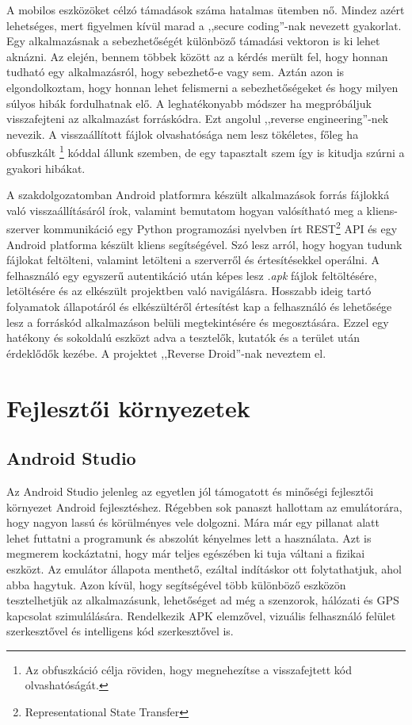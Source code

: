 \documentclass{thesis-ekf}
\theoremstyle{definition}
\theoremstyle{remark}
\begin{document}
A mobilos eszközöket célzó támadások száma hatalmas ütemben nő. Mindez azért lehetséges, mert figyelmen kívül marad a ,,secure coding''-nak nevezett gyakorlat.
Egy alkalmazásnak a sebezhetőségét különböző támadási vektoron is ki lehet aknázni.
Az elején, bennem többek között az a kérdés merült fel, hogy honnan tudható egy alkalmazásról, hogy sebezhető-e vagy sem.
Aztán azon is elgondolkoztam, hogy honnan lehet felismerni a sebezhetőségeket és hogy milyen súlyos hibák fordulhatnak elő.
A leghatékonyabb módszer ha megpróbáljuk visszafejteni az alkalmazást forráskódra.
Ezt angolul ,,reverse engineering''-nek nevezik.
A visszaállított fájlok olvashatósága nem lesz tökéletes, főleg ha obfuszkált \footnote{Az obfuszkáció célja röviden, hogy megnehezítse a visszafejtett kód olvashatóságát.} kóddal állunk szemben, de egy tapasztalt szem így is kitudja szúrni a gyakori hibákat.

A szakdolgozatomban Android platformra készült alkalmazások forrás fájlokká való visszaállításáról írok, valamint bemutatom hogyan valósítható meg a kliens-szerver kommunikáció egy Python programozási nyelvben írt REST\footnote{Representational State Transfer} API és egy Android platforma készült kliens segítségével.
Szó lesz arról, hogy hogyan tudunk fájlokat feltölteni, valamint letölteni a szerverről és értesítésekkel operálni.
A felhasználó egy egyszerű autentikáció után képes lesz \emph{.apk} fájlok feltöltésére, letöltésére és az elkészült projektben való navigálásra.
Hosszabb ideig tartó folyamatok állapotáról és elkészültéről értesítést kap a felhasználó és lehetősége lesz a forráskód alkalmazáson belüli megtekintésére és megosztására.
Ezzel egy hatékony és sokoldalú eszközt adva a tesztelők, kutatók és a terület után érdeklődők kezébe.
A projektet ,,Reverse Droid''-nak neveztem el.

\chapter{Fejlesztői környezetek}\label{kornyezetek}

\section{Android Studio}

Az Android Studio jelenleg az egyetlen jól támogatott és minőségi fejlesztői környezet Android fejlesztéshez.
Régebben sok panaszt hallottam az emulátorára, hogy nagyon lassú és körülményes vele dolgozni.
Mára már egy pillanat alatt lehet futtatni a programunk és abszolút kényelmes lett a használata.
Azt is megmerem kockáztatni, hogy már teljes egészében ki tuja váltani a fizikai eszközt.
Az emulátor állapota menthető, ezáltal indításkor ott folytathatjuk, ahol abba hagytuk.
Azon kívül, hogy segítségével több különböző eszközön tesztelhetjük az alkalmazásunk, lehetőséget ad még a szenzorok, hálózati és GPS kapcsolat szimulálására. 
Rendelkezik APK elemzővel, vizuális felhasználó felület szerkesztővel és intelligens kód szerkesztővel is.
\end{document}
